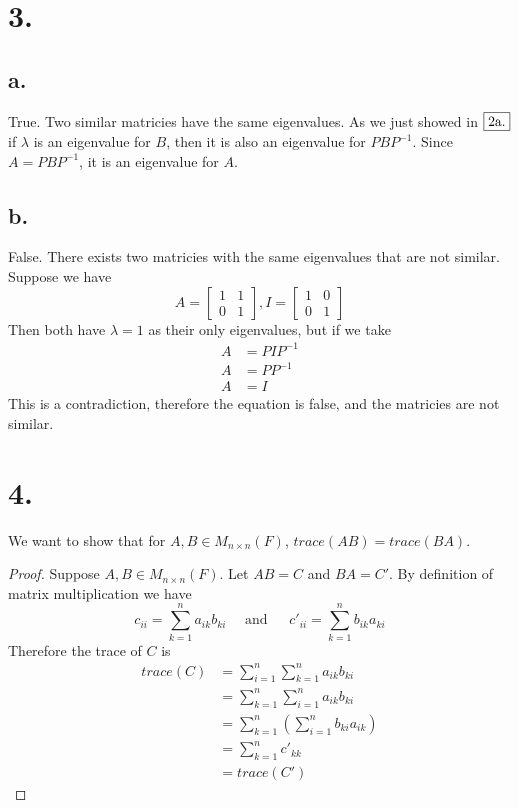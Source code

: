 \documentclass{article}
\begin{document}
\section*{3.}
	\subsection*{a.}
		True. Two similar matricies have the same eigenvalues. As we just showed in $\fbox{2a.}$ if $\lambda$ is an eigenvalue for $B$, then it is also an eigenvalue for $PBP^{-1}$. Since $A = PBP^{-1}$, it is an eigenvalue for $A$.

	\subsection*{b.}
		False. There exists two matricies with the same eigenvalues that are not similar. Suppose we have \[ A = \begin{bmatrix}1&1\\0&1\end{bmatrix}, I = \begin{bmatrix}1&0\\0&1\end{bmatrix} \]
		Then both have $\lambda = 1$ as their only eigenvalues, but if we take 
		\begin{align*}
		A & = PIP^{-1} \\
		A & = PP^{-1} \\
		A & = I
		\end{align*}
		This is a contradiction, therefore the equation is false, and the matricies are not similar.

\section*{4.}
	We want to show that for $A,B \in M_{n \times n} (F)$, $trace(AB) = trace(BA)$.
	\begin{proof}
		Suppose $A,B \in M_{n \times n} (F)$. Let $AB = C$ and $BA = C'$. By definition of matrix multiplication we have 
		\[ c_{ii} = \sum_{k=1}^n a_{ik} b_{ki} \ \ \ \ \ \ \text{and}\ \ \ \ \ \ \ c'_{ii} =\sum_{k=1}^n b_{ik} a_{ki}  \]
		Therefore the trace of $C$ is
		\begin{align*}
		trace(C) & = \sum_{i = 1}^n \sum_{k = 1}^n a_{ik} b_{ki} \\
		& = \sum_{k = 1}^n \sum_{i = 1}^n a_{ik} b_{ki} \\
		& = \sum_{k = 1}^n \left( \sum_{i = 1}^n b_{ki} a_{ik} \right) \\
		& =  \sum_{k = 1}^n c'_{kk} \\
		& = trace(C')
		\end{align*}
	\end{proof}
\end{document}
